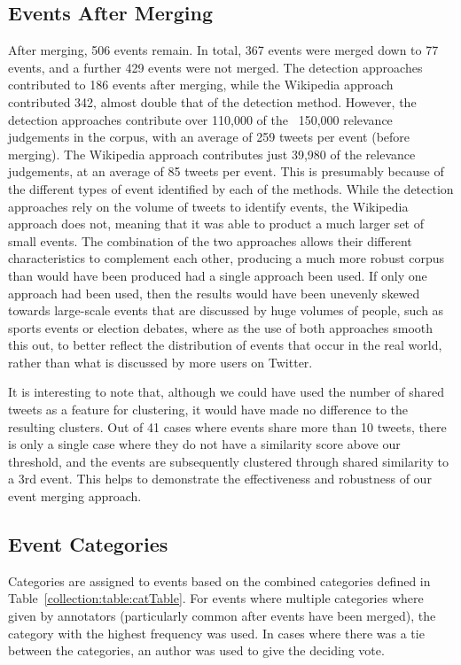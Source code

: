 \subsection{Events After Merging}
After merging, 506 events remain.
In total, 367 events were merged down to 77 events, and a further 429 events were not merged.
The detection approaches contributed to 186 events after merging, while the Wikipedia approach contributed 342, almost double that of the detection method.
However, the detection approaches contribute over 110,000 of the ~150,000 relevance judgements in the corpus, with an average of 259 tweets per event (before merging).
The Wikipedia approach contributes just 39,980 of the relevance judgements, at an average of 85 tweets per event.
This is presumably because of the different types of event identified by each of the methods.
While the detection approaches rely on the volume of tweets to identify events, the Wikipedia approach does not, meaning that it was able to product a much larger set of small events.
The combination of the two approaches allows their different characteristics to complement each other, producing a much more robust corpus than would have been produced had a single approach been used.
If only one approach had been used, then the results would have been unevenly skewed towards large-scale events that are discussed by huge volumes of people, such as sports events or election debates, where as the use of both approaches smooth this out, to better reflect the distribution of events that occur in the real world, rather than what is discussed by more users on Twitter.

It is interesting to note that, although we could have used the number of shared tweets as a feature for clustering, it would have made no difference to the resulting clusters.
Out of 41 cases where events share more than 10 tweets, there is only a single case where they do not have a similarity score above our threshold, and the events are subsequently clustered through shared similarity to a 3rd event.
This helps to demonstrate the effectiveness and robustness of our event merging approach.


\subsection{Event Categories}
Categories are assigned to events based on the combined categories defined in Table~\ref{collection:table:catTable}.
For events where multiple categories where given by annotators (particularly common after events have been merged), the category with the highest frequency was used.
In cases where there was a tie between the categories, an author was used to give the deciding vote.

